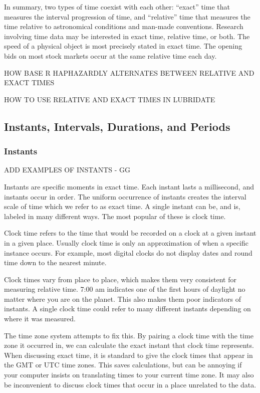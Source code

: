 \documentclass[article]{jss}
\begin{document}
In summary, two types of time coexist with each other: ``exact'' time that measures the interval progression of time, and ``relative'' time that measures the time relative to astronomical conditions and man-made conventions. Research involving time data may be interested in exact time, relative time, or both. The speed of a physical object is most precisely stated in exact time. The opening bids on most stock markets occur at the same relative time each day.  

HOW BASE R HAPHAZARDLY ALTERNATES BETWEEN RELATIVE AND EXACT TIMES

HOW TO USE RELATIVE AND EXACT TIMES IN LUBRIDATE 

\subsection{Instants, Intervals, Durations, and Periods}
\label{sec:types}

\subsubsection{Instants}

ADD EXAMPLES OF INSTANTS - GG

Instants are specific moments in exact time. Each instant lasts a millisecond, and instants occur in order. The uniform occurrence of instants creates the interval scale of time which we refer to as exact time. A single instant can be, and is, labeled in many different ways.  The most popular of these is clock time.

Clock time refers to the time that would be recorded on a clock at a given instant in a given place. Usually clock time is only an approximation of when a specific instance occurs. For example, most digital clocks do not display dates and round time down to the nearest minute.

Clock times vary from place to place, which makes them very consistent for measuring relative time.  7:00 am indicates one of the first hours of daylight no matter where you are on the planet. This also makes them poor indicators of instants. A single clock time could refer to many different instants depending on where it was measured.

The time zone system attempts to fix this.  By pairing a clock time with the time zone it occurred in, we can calculate the exact instant that clock time represents. When discussing exact time, it is standard to give the clock times that appear in the GMT or UTC time zones.  This saves calculations, but can be annoying if your computer insists on translating times to your current time zone.  It may also be inconvenient to discuss clock times that occur in a place unrelated to the data.
\end{document}
